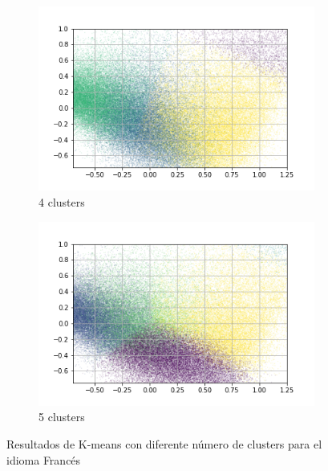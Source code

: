 \begin{figure}
\begin{subfigure}[b]{0.4\textwidth}
         \includegraphics[width=\textwidth]{results/TopicDetection/fr/PCA_4.png}
         \caption{4 clusters}
         \label{fig:fr_kmeans_4}
     \end{subfigure}
     \hfill
     \begin{subfigure}[b]{0.4\textwidth}
         \centering
         \includegraphics[width=\textwidth]{results/TopicDetection/fr/PCA_5.png}
         \caption{5 clusters}
         \label{fig:fr_kmeans_5}
     \end{subfigure}
        \caption{Resultados de K-means con diferente número de clusters para el idioma Francés}
        \label{fig:fr_kmeans}
\end{figure}
